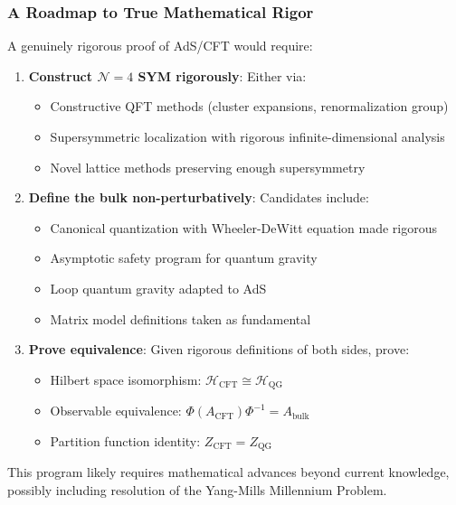 \documentclass[12pt,a4paper]{article}
\begin{document}
\subsubsection{A Roadmap to True Mathematical Rigor}

A genuinely rigorous proof of AdS/CFT would require:

\begin{enumerate}
    \item \textbf{Construct $\mathcal{N}=4$ SYM rigorously}: Either via:
    \begin{itemize}
        \item Constructive QFT methods (cluster expansions, renormalization group)
        \item Supersymmetric localization with rigorous infinite-dimensional analysis
        \item Novel lattice methods preserving enough supersymmetry
    \end{itemize}
    
    \item \textbf{Define the bulk non-perturbatively}: Candidates include:
    \begin{itemize}
        \item Canonical quantization with Wheeler-DeWitt equation made rigorous
        \item Asymptotic safety program for quantum gravity
        \item Loop quantum gravity adapted to AdS
        \item Matrix model definitions taken as fundamental
    \end{itemize}
    
    \item \textbf{Prove equivalence}: Given rigorous definitions of both sides, prove:
    \begin{itemize}
        \item Hilbert space isomorphism: $\mathcal{H}_{\text{CFT}} \cong \mathcal{H}_{\text{QG}}$
        \item Observable equivalence: $\Phi(A_{\text{CFT}})\Phi^{-1} = A_{\text{bulk}}$
        \item Partition function identity: $Z_{\text{CFT}} = Z_{\text{QG}}$
    \end{itemize}
\end{enumerate}

This program likely requires mathematical advances beyond current knowledge, possibly including resolution of the Yang-Mills Millennium Problem.
\end{document}
